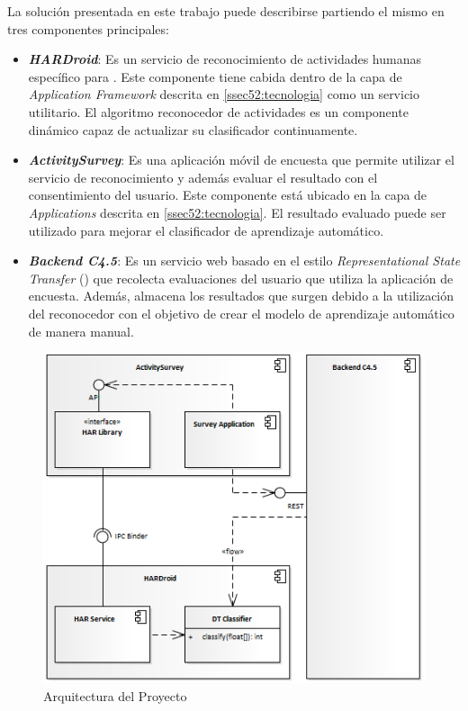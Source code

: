 \label{sec53:arquitectura}La solución presentada en este trabajo
puede describirse partiendo el mismo en tres componentes principales:
\begin{itemize}
\item \textbf{\emph{HARDroid}}: Es un servicio de reconocimiento de actividades
humanas específico para \emph{}. Este componente tiene
cabida dentro de la capa de \emph{Application Framework} descrita
en \ref{ssec52:tecnologia} como un servicio utilitario. El algoritmo
reconocedor de actividades es un componente dinámico capaz de actualizar
su clasificador continuamente.
\item \textbf{\emph{ActivitySurvey}}: Es una aplicación móvil de encuesta
que permite utilizar el servicio de reconocimiento y además evaluar
el resultado con el consentimiento del usuario. Este componente está
ubicado en la capa de \emph{Applications} descrita en \ref{ssec52:tecnologia}.
El resultado evaluado puede ser utilizado para mejorar el clasificador
de aprendizaje automático.
\item \textbf{\emph{Backend C4.5}}: Es un servicio web basado en el estilo
\emph{Representational State Transfer} () que recolecta
evaluaciones del usuario que utiliza la aplicación de encuesta. Además,
almacena los resultados que surgen debido a la utilización del reconocedor
con el objetivo de crear el modelo de aprendizaje automático de manera
manual. 
\end{itemize}
\begin{figure}[H]
\begin{centering}
\includegraphics[width=1\columnwidth]{capitulo-5/graphics/arqui_general}
\par\end{centering}
\caption[Arquitectura del Proyecto]{\label{fig5:arqui-general}Arquitectura del Proyecto}

\end{figure}

